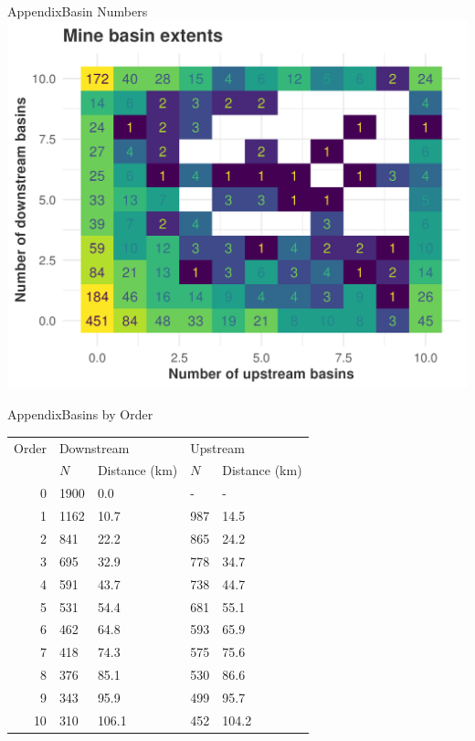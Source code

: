 \documentclass[aspectratio=169,11pt,dvipsnames, handout]{beamer}
\begin{document}
\begin{frame}{\textcolor{defaultclr!30}{Appendix}\hspace{0.75em}Basin Numbers}
\label{frame:appbasinno}
  \centering
  \includegraphics[width=.6\linewidth]{img/mine-basin_extents.png}
  
  \hyperlink{frame:covars}{} 
\end{frame}


\begin{frame}{\textcolor{defaultclr!30}{Appendix}\hspace{0.75em}Basins by Order}
    \centering
    \begin{tabular}{rllll}
      \toprule Order & \multicolumn{2}{l}{Downstream} & \multicolumn{2}{l}{Upstream} \\
        & $N$ & Distance (km) & $N$ & Distance (km) \\ \midrule
      0 & 1900 & 0.0 & - & - \\ 
      1 & 1162 & 10.7 & 987 & 14.5 \\ 
      2 & 841 & 22.2 & 865 & 24.2 \\ 
      3 & 695 & 32.9 & 778 & 34.7 \\ 
      4 & 591 & 43.7 & 738 & 44.7 \\ 
      5 & 531 & 54.4 & 681 & 55.1 \\ 
      6 & 462 & 64.8 & 593 & 65.9 \\ 
      7 & 418 & 74.3 & 575 & 75.6 \\ 
      8 & 376 & 85.1 & 530 & 86.6 \\ 
      9 & 343 & 95.9 & 499 & 95.7 \\ 
      10 & 310 & 106.1 & 452 & 104.2 \\ \bottomrule
    \end{tabular}
    
    \vspace{0.5em}
    
    \hyperlink{frame:covars}{} 
\end{frame}
\end{document}

